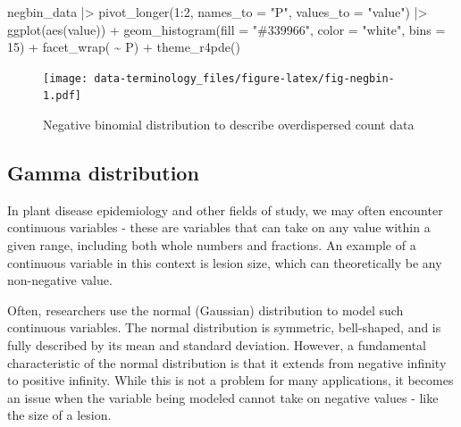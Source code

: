 \documentclass[
  letterpaper,
]{book}
\newenvironment{Shaded}{\begin{snugshade}}{\end{snugshade}}
\newcommand{\AttributeTok}[1]{\textcolor[rgb]{0.40,0.45,0.13}{#1}}
\newcommand{\DecValTok}[1]{\textcolor[rgb]{0.68,0.00,0.00}{#1}}
\newcommand{\FunctionTok}[1]{\textcolor[rgb]{0.28,0.35,0.67}{#1}}
\newcommand{\NormalTok}[1]{\textcolor[rgb]{0.00,0.23,0.31}{#1}}
\newcommand{\SpecialCharTok}[1]{\textcolor[rgb]{0.37,0.37,0.37}{#1}}
\newcommand{\StringTok}[1]{\textcolor[rgb]{0.13,0.47,0.30}{#1}}
\begin{document}
\begin{Shaded}
\begin{Highlighting}[]
\NormalTok{negbin\_data }\SpecialCharTok{|\textgreater{}}
  \FunctionTok{pivot\_longer}\NormalTok{(}\DecValTok{1}\SpecialCharTok{:}\DecValTok{2}\NormalTok{, }\AttributeTok{names\_to =} \StringTok{"P"}\NormalTok{,}
               \AttributeTok{values\_to =} \StringTok{"value"}\NormalTok{) }\SpecialCharTok{|\textgreater{}}
  \FunctionTok{ggplot}\NormalTok{(}\FunctionTok{aes}\NormalTok{(value)) }\SpecialCharTok{+}
  \FunctionTok{geom\_histogram}\NormalTok{(}\AttributeTok{fill =} \StringTok{"\#339966"}\NormalTok{,}
                 \AttributeTok{color =} \StringTok{"white"}\NormalTok{, }\AttributeTok{bins =} \DecValTok{15}\NormalTok{) }\SpecialCharTok{+}
  \FunctionTok{facet\_wrap}\NormalTok{( }\SpecialCharTok{\textasciitilde{}}\NormalTok{ P) }\SpecialCharTok{+}
  \FunctionTok{theme\_r4pde}\NormalTok{()}
\end{Highlighting}
\end{Shaded}

\begin{figure}

\texttt{[image: data-terminology\_files/figure-latex/fig-negbin-1.pdf]} \hfill{}

\caption{\label{fig-negbin}Negative binomial distribution to describe
overdispersed count data}

\end{figure}

\hypertarget{gamma-distribution}{%
\subsection{Gamma distribution}\label{gamma-distribution}}

In plant disease epidemiology and other fields of study, we may often
encounter continuous variables - these are variables that can take on
any value within a given range, including both whole numbers and
fractions. An example of a continuous variable in this context is lesion
size, which can theoretically be any non-negative value.

Often, researchers use the normal (Gaussian) distribution to model such
continuous variables. The normal distribution is symmetric, bell-shaped,
and is fully described by its mean and standard deviation. However, a
fundamental characteristic of the normal distribution is that it extends
from negative infinity to positive infinity. While this is not a problem
for many applications, it becomes an issue when the variable being
modeled cannot take on negative values - like the size of a lesion.
\end{document}
